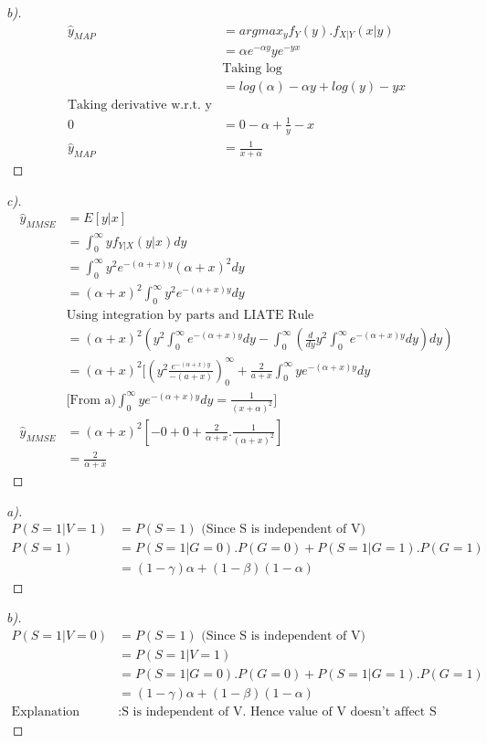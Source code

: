 \documentclass[12pt]{article}
\newenvironment{theorem}[2][Theorem]{\begin{trivlist}
\item[\hskip \labelsep {\bfseries #1}\hskip \labelsep {\bfseries #2.}]}{\end{trivlist}}
\begin{document}
\begin{theorem}[Ans]{4}
\begin{proof}[b)]
\begin{align*}
\hat{y}_{MAP} &= argmax_{y} f_{Y}(y).f_{X|Y}(x|y)\\
&= \alpha e^{-\alpha y}y e^{-yx}\\
&\text{Taking log}\\
&=log(\alpha) - \alpha y + log(y) -yx\\
\text{Taking derivative w.r.t. y}\\
0&= 0-\alpha+\frac{1}{y}-x\\
\hat{y}_{MAP} &= \frac{1}{x+\alpha}
\end{align*}
\end{proof}
\begin{proof}[c)]
\begin{align*}
\hat{y}_{MMSE}&=E[y|x]\\
&=\int_{0}^{\infty}yf_{Y|X}(y|x)dy\\
&=\int_{0}^{\infty}y^{2}e^{-(\alpha+x)y}(\alpha+x)^{2}dy\\
&=(\alpha+x)^{2}\int_{0}^{\infty}y^{2}e^{-(\alpha+x)y}dy\\
&\text{Using integration by parts and LIATE Rule}\\
&= (\alpha+x)^{2}(y^{2}\int_{0}^{\infty}e^{-(\alpha+x)y}dy-\int_{0}^{\infty}(\frac{d}{dy}y^{2}\int_{0}^{\infty}e^{-(\alpha+x)y}dy)dy)\\
&=(\alpha+x)^{2}[(y^{2}\frac{e^{-(\alpha+x)y}}{-(a+x)})_{0}^{\infty} + \frac{2}{a+x}\int_{0}^{\infty}ye^{-(\alpha+x)y}dy\\
&\text{[From a)} \int_{0}^{\infty}ye^{-(\alpha+x)y} dy=  \frac{1}{(x+\alpha)^{2}}\text{]}\\
\hat{y}_{MMSE}&=(\alpha+x)^{2}[-0+0+\frac{2}{\alpha+x}.\frac{1}{(\alpha+x)^2}]\\
&=\frac{2}{\alpha+x}
\end{align*}
\end{proof}
\end{theorem}
\begin{theorem}[Ans]{5}
\begin{proof}[a)]
\begin{align*}
P(S=1|V=1) &= P(S=1) \text{ (Since S is independent of V)}\\
P(S=1) &= P(S=1|G=0).P(G=0)+P(S=1|G=1).P(G=1)\\
&= (1-\gamma)\alpha+(1-\beta)(1-\alpha)
\end{align*}
\end{proof}
\begin{proof}[b)]
\begin{align*}
P(S=1|V=0)  &= P(S=1) \text{ (Since S is independent of V)}\\
&= P(S=1|V=1)\\
&= P(S=1|G=0).P(G=0)+P(S=1|G=1).P(G=1)\\
&= (1-\gamma)\alpha+(1-\beta)(1-\alpha)\\
\text{Explanation} &: \text{S is independent of V. Hence value of V doesn't affect S}
\end{align*}
\end{proof}
\end{theorem}
\end{document}
